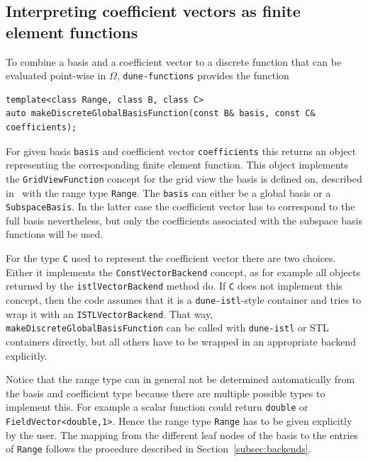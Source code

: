 \documentclass[a4paper,10pt,headings=normal,bibliography=totoc]{scrartcl}
\newcommand{\cpp}[1]{\lstinline[basicstyle=\ttfamily]!#1!}
\newcommand{\dunemodule}[1]{\texttt{#1}}
\begin{document}
\subsection{Interpreting coefficient vectors as finite element functions}

To combine a basis and a coefficient vector to a discrete function that
can be evaluated point-wise in $\Omega$, \cpp{dune-functions} provides
the function
%
\begin{lstlisting}[style=Interface]
template<class Range, class B, class C>
auto makeDiscreteGlobalBasisFunction(const B& basis, const C& coefficients);
\end{lstlisting}
%
For given basis \cpp{basis} and coefficient vector \cpp{coefficients}
this returns an object representing the corresponding
finite element function. This object implements the \cpp{GridViewFunction}
concept for the grid view the basis is defined on, described in~\cite{engwer_graeser_muething_sander:2015}
with the range type \cpp{Range}.
The \cpp{basis} can either be a global basis or
a \cpp{SubspaceBasis}.  In the latter case the coefficient
vector has to correspond to the full basis nevertheless, but only
the coefficients associated with the subspace basis functions
will be used.

For the type \cpp{C} used to represent the coefficient vector there are two choices.
Either it implements the \cpp{ConstVectorBackend} concept, as for example all objects
returned by the \cpp{istlVectorBackend} method do.  If \cpp{C} does not implement
this concept, then the code assumes that it is a \dunemodule{dune-istl}-style
container and tries to wrap it with an \cpp{ISTLVectorBackend}.
That way, \cpp{makeDiscreteGlobalBasisFunction} can be called with \dunemodule{dune-istl}
or STL containers directly, but all others have to be wrapped in an appropriate backend
explicitly.

Notice that the range type can in general not be
determined automatically from the basis and coefficient type
because there are multiple possible types to implement this.
For example a scalar function could return \cpp{double}
or \cpp{FieldVector<double,1>}.
Hence the range type \cpp{Range} has to be given explicitly
by the user. The mapping from the different leaf nodes of the basis
to the entries of \cpp{Range} follows the procedure described
in Section~\ref{subsec:backends}.
\end{document}
